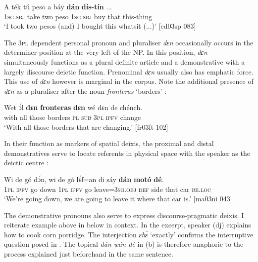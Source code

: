 \ea%
    \label{ex:key:203}
    \gll A    ték    tú  peso  a    báy  \textbf{dán}    \textbf{dís-tín}  \op...\cp\\
\textsc{1sg.sbj}  take    two  peso  \textsc{1sg.sbj}  buy  that    this-thing\\

\glt ‘I took two pesos (and) I bought this whatsit (...)’ [ed03sp 083]
\z

The \textsc{3pl} dependent personal pronoun and pluraliser \textit{dɛn} occasionally occurs in the determiner position at the very left of the NP. In this position, \textit{dɛn} simultaneously functions as a plural definite article and a demonstrative with a largely discourse deictic function. Prenominal \textit{dɛn} usually also has emphatic force. This use of \textit{dɛn} however is marginal in the corpus. Note the additional presence of \textit{dɛn} as a pluraliser after the noun \textit{fronteras} ‘borders’ :   

\ea%
\label{ex:key:204}
\gll Wet    ɔ́l  \textbf{dɛn}    \textbf{fronteras}  \textbf{dɛn}  wé  dɛn  de  chénch.\\
with    all  those  borders    \textsc{pl}  \textsc{sub}  \textsc{3pl}  \textsc{ipfv}  change\\

\glt ‘With all those borders that are changing.’ [fr03ft 102]
\z

In their function as markers of spatial deixis, the proximal and distal demonstratives serve to locate referents in physical space with the speaker as the deictic centre :


\ea%
    \label{ex:key:205}
    \gll Wi  de  gó  dɔ́n,    wi  de  gó  lɛ́f=an    di  sáy
\textbf{dán}    \textbf{motó}\textstylePichiexamplespaceZchn{} \textbf{dé}.\\
\textsc{1pl}  \textsc{ipfv}  go  down  \textsc{1pl}  \textsc{ipfv}  go  leave=\textsc{3sg.obj}  \textsc{def}  side
that    car    \textsc{be.loc}\\

\glt ‘We’re going down, we are going to leave it where that car is.’ [ma03ni 043]
\z

The demonstrative pronouns also serve to express discourse-pragmatic deixis. I reiterate example  above in  below in context. In the excerpt, speaker (dj) explains how to cook corn porridge. The interjection \textit{ɛhɛ́} ‘exactly’ confirms the interruptive question posed in . The topical \textit{dán wán dé} in (b) is therefore anaphoric to the process explained just beforehand in the same sentence. 


